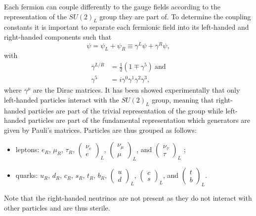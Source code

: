     Each fermion can couple differently to the gauge fields according to the representation of the $ SU(2)_L $ group they are part of. To determine the coupling constants it is important to separate each fermionic field into its left-handed and right-handed components such that
    \begin{equation}
      \psi = \psi_L + \psi_R \equiv \gamma^L \psi + \gamma^R \psi ,
    \end{equation}
    with
    \begin{align}
      \gamma^{L/R} & = \frac{1}{2} \left( 1 \mp \gamma^5 \right) \ \text{and} \\
      \gamma^5 & = i \gamma^0 \gamma^1 \gamma^2 \gamma^3 ,
    \end{align}
    where $ \gamma^\mu $ are the Dirac matrices. It has been showed experimentally that only left-handed particles interact with the $ SU(2)_L $ group, meaning that right-handed particles are part of the trivial representation of the group while left-handed particles are part of the fundamental representation which generators are given by Pauli's matrices. Particles are thus grouped as follows:
    \begin{itemize}
      \item leptons: $ e_R $, $ \mu_R $, $ \tau_R $, $ \left( \begin{matrix} \nu_e \\ e \end{matrix} \right)_L $, $ \left( \begin{matrix} \nu_\mu \\ \mu \end{matrix} \right)_L $, and $ \left( \begin{matrix} \nu_\tau \\ \tau \end{matrix} \right)_L $ ;
      \item quarks: $ u_R $, $ d_R $, $ c_R $, $ s_R $, $ t_R $, $ b_R $, $ \left( \begin{matrix} u \\ d \end{matrix} \right)_L $, $ \left( \begin{matrix} c \\ s \end{matrix} \right)_L $, and $ \left( \begin{matrix} t \\ b \end{matrix} \right)_L $.
    \end{itemize}
    Note that the right-handed neutrinos are not present as they do not interact with other particles and are thus sterile. \\

